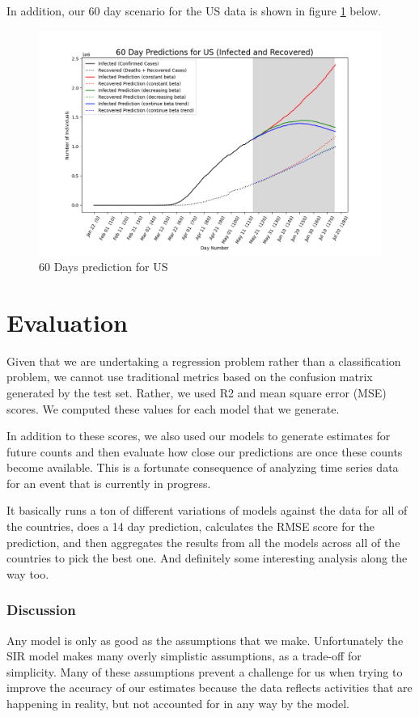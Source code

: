 \documentclass[11pt]{article}
\begin{document}
In addition, our 60 day scenario for the US data is shown in figure \ref{fig:60-days-prediction-us} below. 

\begin{figure}[h]
    \includegraphics[width=16cm]{images/60-days-prediction-US.png}
    \centering
    \caption{60 Days prediction for US}
    \label{fig:60-days-prediction-us}
\end{figure}

\section{Evaluation}
Given that we are undertaking a regression problem rather than a classification problem, we cannot use traditional metrics based on the confusion matrix generated by the test set.  Rather, we used R2 and mean square error (MSE) scores. We computed these values for each model that we generate. 

In addition to these scores, we also used our models to generate estimates for future counts and then evaluate how close our predictions are once these counts become available. This is a fortunate consequence of analyzing time series data for an event that is currently in progress.

It basically runs a ton of different variations of models against the data for all of the countries, does a 14 day prediction, calculates the RMSE score for the prediction, and then aggregates the results from all the models across all of the countries to pick the best one. And definitely some interesting analysis along the way too.

\subsubsection{Discussion}
Any model is only as good as the assumptions that we make. Unfortunately the SIR model makes many overly simplistic assumptions, as a trade-off for simplicity. Many of these assumptions prevent a challenge for us when trying to improve the accuracy of our estimates because the data reflects activities that are happening in reality, but not accounted for in any way by the model.
\end{document}
